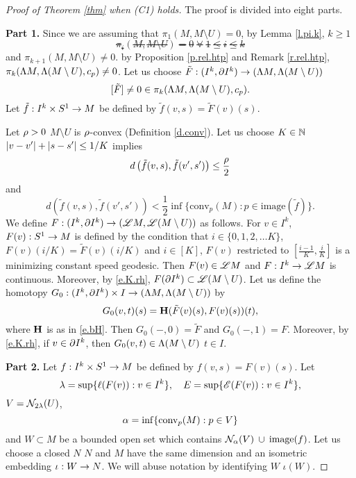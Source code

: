 \documentclass[11pt,twoside]{article}
\begin{document}
\begin{proof}[Proof of Theorem \ref{thm} when (C1) holds]
The proof is divided into eight parts.

\noindent\textbf{Part 1.} Since we are assuming that $\pi_1(M,M\setminus U)=0$, by Lemma \ref{l.pi.k}, \tes \(k\geq 1\) \st 
\begin{equation}\label{e.pi.M.U}
\pi_i(M,M\setminus U)=0 \; \forall \; 1\leq i \leq k
\end{equation}
 and \(\pi_{k+1}(M,M\setminus U)\neq 0\). \tf by Proposition \ref{p.rel.htp} and Remark \ref{r.rel.htp}, \(\pi_{k}(\Lambda M,\Lambda (M\setminus U),c_p)\neq 0\). Let us choose \(\tilde{F}:(I^k,\partial I^k)\rightarrow (\Lambda M, \Lambda (M\setminus U))\) \sot 
 \begin{equation}\label{e.[F].nonzero}
 [\tilde{F}]\neq 0\in \pi_k(\Lambda M, \Lambda (M\setminus U),c_p).
 \end{equation}
 Let \(\tilde{f}:I^k\times S^1 \rightarrow M\) be defined by \(\tilde{f}(v,s)=\tilde{F}(v)(s)\). 
 
 Let \(\rho>0\) \st \(M\setminus U\) is \(\rho\)-convex (Definition \ref{d.conv}). Let us choose \(K\in \mathbb{N}\) \sot \(\left|v-v'\right|+\left|s-s'\right|\leq 1/K\) implies 
 \begin{equation}\label{e.K.rh}
 d\left(\tilde{f}(v,s), \tilde{f}(v',s')\right)\leq \frac{\rho}{2}
 \end{equation} 
 and
 \[d\left(\tilde{f}(v,s), \tilde{f}(v',s')\right)<\frac{1}{2}\inf\{\text{conv}_p(M):p\in \text{image}(\tilde{f})\}.\]
 We define \(F:(I^k,\partial I^k)\rightarrow (\mathscr{L} M, \mathscr{L} (M\setminus U))\) as follows. For $v\in I^k$, $F(v):S^1\rightarrow M$ is defined by the condition that \fa \(i\in \{0,1,2,\dots K\}\), \(F(v)(i/K)=\tilde{F}(v)(i/K)\) and \fa $i\in [K]$, \(F(v)\) restricted to \([\frac{i-1}{K},\frac{i}{K}]\) is a minimizing constant speed geodesic. Then $F(v)\in \mathscr{L} M$ and $F:I^k\rightarrow \mathscr{L} M$ is continuous. Moreover, by \eqref{e.K.rh}, $F(\partial I^k)\subset \mathscr{L} (M\setminus U)$. Let us define the homotopy \(G_0:(I^k,\partial I^k)\times I\rightarrow (\Lambda M, \Lambda (M\setminus U))\) by 
 \[G_0(v,t)(s)=\mathbf{H}(\tilde{F}(v)(s),F(v)(s))(t),\]
 where \(\mathbf{H}\) is as in \eqref{e.bH}. Then \(G_0(-,0)=\tilde{F}\) and \(G_0(-,1)=F\). Moreover, by \eqref{e.K.rh}, if $v\in \partial I^k$, then $G_0(v,t)\in \Lambda (M\setminus U)$ \fa $t\in I$. 
  
 
\noindent\textbf{Part 2.} Let \(f:I^k\times S^1 \rightarrow M\) be defined by \(f(v,s)=F(v)(s)\). Let
\begin{equation}\label{e.la.E}
\lambda=\sup\{\ell(F(v)):v\in I^k\},\quad E=\sup\{\mathscr{E}(F(v)):v\in I^k\},
\end{equation}
$V=\mathcal{N}_{2\lambda}(U)$,
\begin{equation}\label{e.al}
\alpha=\inf \{\text{conv}_p(M):p\in V \}
\end{equation}
and $W\subset M$ be a bounded open set which contains \(\mathcal{N}_{\alpha}(V)\:\cup\:\text{image}(f)\). Let us choose a closed \Rm \mf \(N\) \st \(N\) and \(M\) have the same dimension and \tes an isometric embedding \(\iota:W \rightarrow N\). We will abuse notation by identifying \(W\) \w \(\iota(W)\).


\end{proof}
\end{document}
